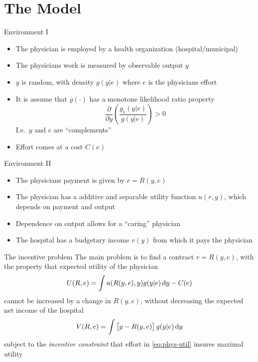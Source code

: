 \documentclass[compress]{beamer}
\begin{document}
\section*{The Model}
    
\begin{frame}[c]{Environment I}
  \begin{itemize}[<+- | alert@+>]
    \item The physician is employed by a health organization (hospital/municipal)
    \item The physicians work is measured by observable output $y$
    \item $y$ is random, with density $g(y|e)$ where $e$ is the physicians effort
    \item It is assume that $g(\cdot)$ has a monotone likelihood ratio property
          \[
            \frac{\partial}{\partial y}\left(\frac{g_e(y|e)}{g(y|e)}\right)>0
          \]
          I.e.\ $y$ and $e$ are ``complements''
    \item Effort comes at a cost $C(e)$
  \end{itemize}
\end{frame}

\begin{frame}[c]{Environment II}
  \begin{itemize}[<+- | alert@+>]
    \item The physicians payment is given by $r=R(y,e)$
    \item The physician has a additive and separable utility function $u(r,y)$, which depends on payment and output
    \item Dependence on output allows for a ``caring'' physician
    \item The hospital has a budgetary income $v(y)$ from which it pays the physician
  \end{itemize}
\end{frame}

\begin{frame}[c]{The incentive problem}
  The main problem is to find a contract $r=R(y,e)$, with the property that expected utility of the physician
  \begin{align}
    U(R,e)=\int u(R(y,e),y)g(y|e)\dif y-C(e) \label{eq:phys-util} 
  \end{align}
  cannot be increased by a change in $R(y,e)$, without decreasing the expected net income of the hospital
  \[
    V(R,e)=\int \left[y-R(y,e)\right] g(y|e)\dif y
  \]
  subject to the \emph{incentive constraint} that effort in \cref{eq:phys-util} insures maximal utility
\end{frame}
\end{document}
